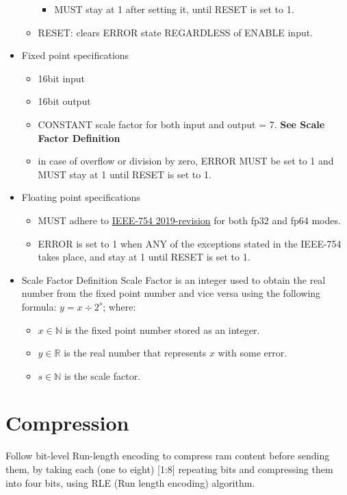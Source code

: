 \documentclass[12pt]{report}
\begin{document}
\begin{itemize}
\begin{itemize}
\begin{itemize}
            \item MUST stay at 1 after setting it, until RESET is set to 1.
        \end{itemize}
        \item RESET: clears ERROR state REGARDLESS of ENABLE input.
    \end{itemize}
    \item Fixed point specifications
    \begin{itemize}
        \item 16bit input
        \item 16bit output
        \item CONSTANT scale factor for both input and output = 7. \textbf{See Scale Factor Definition}
        \item in case of overflow or division by zero, ERROR MUST be set to 1 and MUST stay at 1 until RESET is set to 1.
    \end{itemize}
    \item Floating point specifications
    \begin{itemize}
        \item MUST adhere to \href{https://en.wikipedia.org/wiki/IEEE_754}{IEEE-754 2019-revision} for both fp32 and fp64 modes.
        \item ERROR is set to 1 when ANY of the exceptions stated in the IEEE-754 takes place, and stay at 1 until RESET is set to 1.
    \end{itemize}
    \item Scale Factor Definition
    Scale Factor is an integer used to obtain the real number from the fixed point number and vice versa using the following formula: 
    $y = x \div 2^s$; where: 
    \begin{itemize}
        \item $x \in \mathbb{N}$ is the fixed point number stored as an integer.
        \item $y \in \mathbb{R}$ is the real number that represents $x$ with some error.
        \item $s \in \mathbb{N}$ is the scale factor.
    \end{itemize}
\end{itemize}

\section{Compression}
Follow bit-level Run-length encoding to compress ram content before sending them, by taking each (one to eight) [1:8] repeating bits and compressing them into four bits, using RLE (Run length encoding) algorithm.
\end{document}
